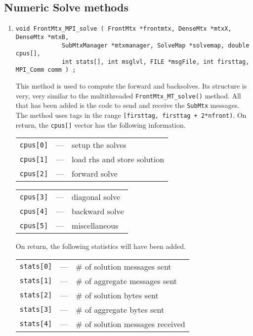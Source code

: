 \subsection{Numeric Solve methods}
\label{subsection:MPI:proto:solve}
\par
\begin{enumerate}
\item
\begin{verbatim}
void FrontMtx_MPI_solve ( FrontMtx *frontmtx, DenseMtx *mtxX, DenseMtx *mtxB,
             SubMtxManager *mtxmanager, SolveMap *solvemap, double cpus[], 
             int stats[], int msglvl, FILE *msgFile, int firsttag, MPI_Comm comm ) ;
\end{verbatim}
This method is used to compute the forward and backsolves.
Its structure is very, very similar to the multithreaded
{\tt FrontMtx\_MT\_solve()} method.
All that has been added is the code to send and receive 
the {\tt SubMtx} messages.
The method uses tags in the range
{\tt [firsttag, firsttag + 2*nfront)}.
On return, the {\tt cpus[]} vector has the following information.
\begin{center}
\begin{tabular}{ccl}
{\tt cpus[0]} & --- & setup the solves \\
{\tt cpus[1]} & --- & load rhs and store solution \\
{\tt cpus[2]} & --- & forward solve
\end{tabular}
\begin{tabular}{ccl}
{\tt cpus[3]} & --- & diagonal solve \\
{\tt cpus[4]} & --- & backward solve \\
{\tt cpus[5]} & --- & miscellaneous 
\end{tabular}
\end{center}
On return, the following statistics will have been added.
\begin{center}
\begin{tabular}{ccl}
{\tt stats[0]} & --- & \# of solution messages sent \\
{\tt stats[1]} & --- & \# of aggregate messages sent \\
{\tt stats[2]} & --- & \# of solution bytes sent \\
{\tt stats[3]} & --- & \# of aggregate bytes sent \\
{\tt stats[4]} & --- & \# of solution messages received \\

\end{tabular}
\end{center}
\end{enumerate}
